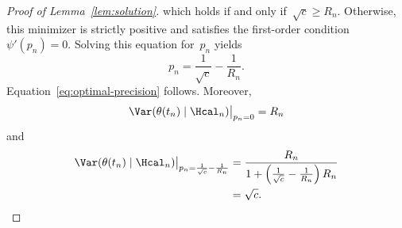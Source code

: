 \begin{proof}[Proof of Lemma~\ref{lem:solution}]
    which holds if and only if~$\sqrt{c}\ge R_n$.
    Otherwise, this minimizer is strictly positive and satisfies the first-order condition~$\psi'(p_n)=0$.
    Solving this equation for~$p_n$ yields
    \[ p_n=\frac{1}{\sqrt{c}}-\frac{1}{R_n}. \]
    Equation~\eqref{eq:optimal-precision} follows.
    Moreover,
    \[ \Var(\theta(t_n)\mid\Hcal_n)\big\rvert_{p_n=0}=R_n \]
    and
    \begin{align*}
        \Var(\theta(t_n)\mid\Hcal_n)\big\rvert_{p_n=\frac{1}{\sqrt{c}}-\frac{1}{R_n}}
        &= \frac{R_n}{1+\left(\frac{1}{\sqrt{c}}-\frac{1}{R_n}\right)R_n} \\
        &= \sqrt{c}.\qedhere
    \end{align*}
\end{proof}
